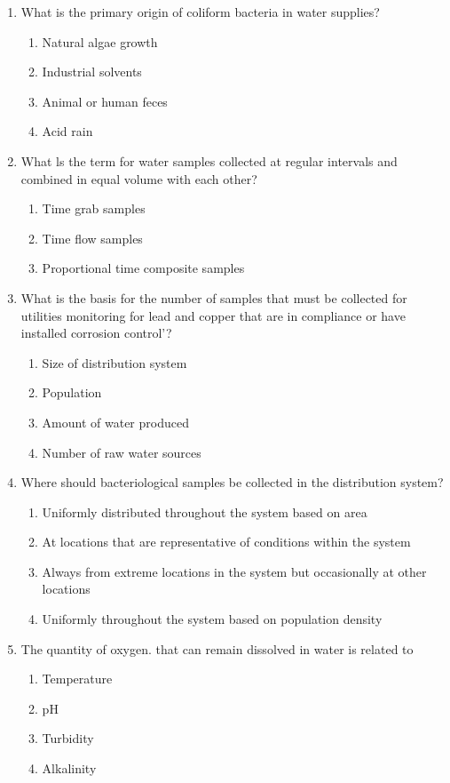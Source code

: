 \begin{enumerate}[1.]
\item 	What is the primary origin of coliform bacteria in water supplies?
\begin{enumerate}
\item 	Natural algae growth
\item 	Industrial solvents
\item 	Animal or human feces
\item 	Acid rain
\end{enumerate}

\item 	What ls the term for water samples collected at regular intervals and combined in equal volume with each other?
\begin{enumerate}
\item 	Time grab samples
\item 	Time flow samples
\item Proportional time composite samples
\end{enumerate}

\item 	What is the basis for the number of samples that must be collected for utilities monitoring for lead and copper that are in compliance or have installed corrosion control'?
\begin{enumerate}
\item 	Size of distribution system
\item 	Population
\item 	Amount of water produced
\item 	Number of raw water sources
\end{enumerate}

\item 	Where should bacteriological samples be collected in the distribution system?
\begin{enumerate}
\item 	Uniformly distributed throughout the system based on area
\item 	At locations that are representative of conditions within the system
\item 	Always from extreme locations in the system but occasionally at other locations
\item 	Uniformly throughout the system based on population density
\end{enumerate}
 
\item 	The	quantity of oxygen. that can remain dissolved in water is related to
\begin{enumerate}
\item 	Temperature
\item 	pH
\item 	Turbidity
\item 	Alkalinity
\end{enumerate}


\end{enumerate}
